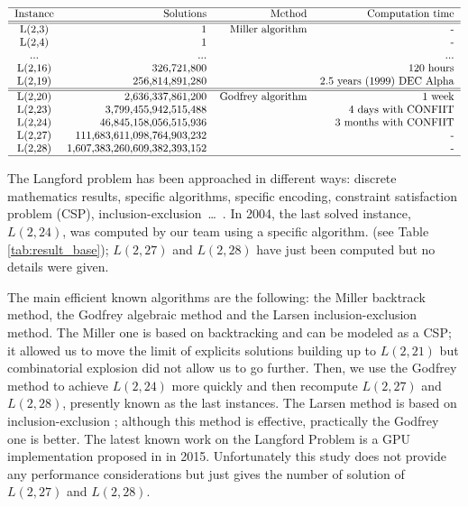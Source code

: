 \begin{table}[t!]
\centering
\[
\begin{tabular}{c r r r}
  \hline
  Instance & Solutions & Method & Computation time\\
  \hline
  \hline
  L(2,3) & 1 &  Miller algorithm & - \\
  L(2,4) & 1 & & - \\ 
  ... & ... & & ...  \\
  L(2,16) & 326,721,800 & & 120 hours  \\
  L(2,19) & 256,814,891,280 & & 2.5 years (1999) DEC Alpha \\
  \hline
  \hline
  L(2,20) & 2,636,337,861,200 & Godfrey algorithm & 1 week \\
  L(2,23) & 3,799,455,942,515,488 & &  4 days with CONFIIT \\
  L(2,24) & 46,845,158,056,515,936 & & 3 months with CONFIIT \\
  L(2,27) & 111,683,611,098,764,903,232 & & - \\
  L(2,28) & 1,607,383,260,609,382,393,152 & & - \\
  \hline
\end{tabular}
\]
\caption{Solutions and time for Langford problem using different methods}
\label{tab:result_base}
\end{table}

The Langford problem has been approached in different ways: discrete mathematics results, specific algorithms, specific encoding, constraint satisfaction problem (CSP), inclusion-exclusion~\ldots~\cite{Mil00,apes-26,Smi00,larsen2009counting}.
In 2004, the last solved instance, $L(2,24)$, was computed by our team\cite{CReSTIC-711} using a specific algorithm. (see Table \ref{tab:result_base}); $L(2,27)$ and $L(2,28)$ have just been computed but no details were given. 

The main efficient known algorithms are the following: the Miller backtrack method, the Godfrey algebraic method and the Larsen inclusion-exclusion method.
The Miller one is based on backtracking and can be modeled as a CSP; it allowed us to move the limit of explicits solutions building up to $L(2,21)$ but combinatorial explosion did not allow us to go further. 
Then, we use the Godfrey method to achieve $L(2,24)$ more quickly and then recompute $L(2,27)$ and $L(2,28)$, presently known as the last instances.
The Larsen method is based on inclusion-exclusion \cite{larsen2009counting}; although this method is effective, practically the Godfrey one is better. 
The latest known work on the Langford Problem is a GPU implementation proposed in \cite{ASS_LGF} in 2015. Unfortunately this study does not provide any performance considerations but just gives the number of solution of $L(2,27)$ and $L(2,28)$.

